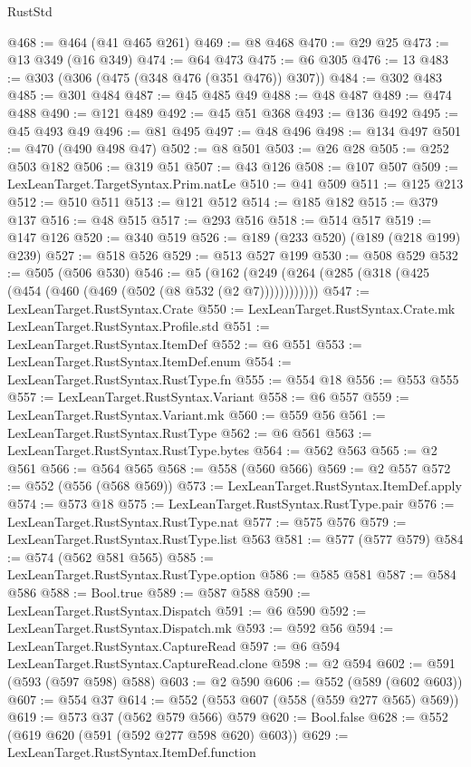 \begin{lexlean}{RustStd}
\begin{coremodule}
@468 := @464 (@41 @465 @261)
@469 := @8 @468
@470 := @29 @25
@473 := @13 @349 (@16 @349)
@474 := @64 @473
@475 := @6 @305
@476 := 13
@483 := @303 (@306 (@475 (@348 @476 (@351 @476)) @307))
@484 := @302 @483
@485 := @301 @484
@487 := @45 @485 @49
@488 := @48 @487
@489 := @474 @488
@490 := @121 @489
@492 := @45 @51 @368
@493 := @136 @492
@495 := @45 @493 @49
@496 := @81 @495
@497 := @48 @496
@498 := @134 @497
@501 := @470 (@490 @498 @47)
@502 := @8 @501
@503 := @26 @28
@505 := @252 @503 @182
@506 := @319 @51
@507 := @43 @126
@508 := @107 @507
@509 := LexLeanTarget.TargetSyntax.Prim.natLe
@510 := @41 @509
@511 := @125 @213
@512 := @510 @511
@513 := @121 @512
@514 := @185 @182
@515 := @379 @137
@516 := @48 @515
@517 := @293 @516
@518 := @514 @517
@519 := @147 @126
@520 := @340 @519
@526 := @189 (@233 @520) (@189 (@218 @199) @239)
@527 := @518 @526
@529 := @513 @527 @199
@530 := @508 @529
@532 := @505 (@506 @530)
@546 := @5 (@162 (@249 (@264 (@285 (@318 (@425 (@454 (@460 (@469 (@502 (@8 @532 (@2 @7))))))))))))
@547 := LexLeanTarget.RustSyntax.Crate
@550 := LexLeanTarget.RustSyntax.Crate.mk LexLeanTarget.RustSyntax.Profile.std
@551 := LexLeanTarget.RustSyntax.ItemDef
@552 := @6 @551
@553 := LexLeanTarget.RustSyntax.ItemDef.enum
@554 := LexLeanTarget.RustSyntax.RustType.fn
@555 := @554 @18
@556 := @553 @555
@557 := LexLeanTarget.RustSyntax.Variant
@558 := @6 @557
@559 := LexLeanTarget.RustSyntax.Variant.mk
@560 := @559 @56
@561 := LexLeanTarget.RustSyntax.RustType
@562 := @6 @561
@563 := LexLeanTarget.RustSyntax.RustType.bytes
@564 := @562 @563
@565 := @2 @561
@566 := @564 @565
@568 := @558 (@560 @566)
@569 := @2 @557
@572 := @552 (@556 (@568 @569))
@573 := LexLeanTarget.RustSyntax.ItemDef.apply
@574 := @573 @18
@575 := LexLeanTarget.RustSyntax.RustType.pair
@576 := LexLeanTarget.RustSyntax.RustType.nat
@577 := @575 @576
@579 := LexLeanTarget.RustSyntax.RustType.list @563
@581 := @577 (@577 @579)
@584 := @574 (@562 @581 @565)
@585 := LexLeanTarget.RustSyntax.RustType.option
@586 := @585 @581
@587 := @584 @586
@588 := Bool.true
@589 := @587 @588
@590 := LexLeanTarget.RustSyntax.Dispatch
@591 := @6 @590
@592 := LexLeanTarget.RustSyntax.Dispatch.mk
@593 := @592 @56
@594 := LexLeanTarget.RustSyntax.CaptureRead
@597 := @6 @594 LexLeanTarget.RustSyntax.CaptureRead.clone
@598 := @2 @594
@602 := @591 (@593 (@597 @598) @588)
@603 := @2 @590
@606 := @552 (@589 (@602 @603))
@607 := @554 @37
@614 := @552 (@553 @607 (@558 (@559 @277 @565) @569))
@619 := @573 @37 (@562 @579 @566) @579
@620 := Bool.false
@628 := @552 (@619 @620 (@591 (@592 @277 @598 @620) @603))
@629 := LexLeanTarget.RustSyntax.ItemDef.function

\end{coremodule}
\end{lexlean}

